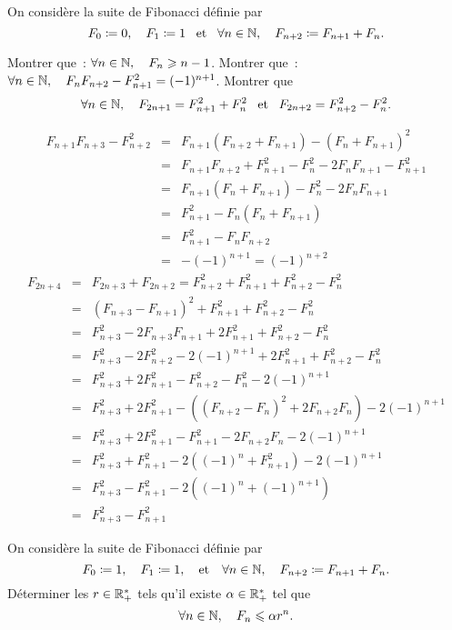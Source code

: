 \documentclass{magnolia}
\begin{document}
On considère la suite de {\sc Fibonacci} définie par
\[F_0\coloneqq 0,\quad F_1\coloneqq 1 \quad\!\text{et}\quad\! \forall n\in\mathbb{N},\quad F_{n+2}\coloneqq F_{n+1}+F_n.\]
\begin{questions} 
\question Montrer que~: $\forall n\in\mathbb{N},\quad F_n\geqslant n-1$. 
\question Montrer que~: $\forall n\in\mathbb{N},\quad F_nF_{n+2}-F_{n+1}^2=(-1)^{n+1}$. 
\question Montrer que
  \[\forall n\in\mathbb{N},\quad F_{2n+1}=F_{n+1}^2+F_n^2 \quad\!\text{et}\quad\! F_{2n+2}=F_{n+2}^2-F_{n}^2.\]
\end{questions}
\begin{sol}
\begin{questions}
\question
\question
\begin{eqnarray*}
F_{n+1}F_{n+3}-F_{n+2}^2
&=& F_{n+1}(F_{n+2}+F_{n+1})-(F_n+F_{n+1})^2\\
&=& F_{n+1}F_{n+2}+F_{n+1}^2-F_n^2-2F_n F_{n+1}-F_{n+1}^2\\
&=& F_{n+1}(F_n+F_{n+1}) -F_n^2-2F_n F_{n+1}\\
&=& F_{n+1}^2-F_n(F_n+F_{n+1})\\
&=& F_{n+1}^2-F_n F_{n+2}\\
&=& -(-1)^{n+1} = (-1)^{n+2}
\end{eqnarray*}
\question
\begin{eqnarray*}
F_{2n+4}
&=& F_{2n+3}+F_{2n+2}=F_{n+2}^2+F_{n+1}^2+F_{n+2}^2-F_{n}^2\\
&=& (F_{n+3}-F_{n+1})^2+F_{n+1}^2+F_{n+2}^2-F_{n}^2\\
&=& F_{n+3}^2-2F_{n+3}F_{n+1}+2F_{n+1}^2+F_{n+2}^2-F_{n}^2\\
&=& F_{n+3}^2-2F_{n+2}^2-2(-1)^{n+1}+2F_{n+1}^2+F_{n+2}^2-F_{n}^2\\
&=& F_{n+3}^2+2F_{n+1}^2-F_{n+2}^2-F_{n}^2-2(-1)^{n+1}\\
&=& F_{n+3}^2+2F_{n+1}^2-((F_{n+2}-F_{n})^2+2F_{n+2}F_n)-2(-1)^{n+1}\\
&=& F_{n+3}^2+2F_{n+1}^2-F_{n+1}^2-2F_{n+2}F_n-2(-1)^{n+1}\\
&=& F_{n+3}^2+F_{n+1}^2-2((-1)^n+F_{n+1}^2)-2(-1)^{n+1}\\
&=& F_{n+3}^2-F_{n+1}^2-2((-1)^n+(-1)^{n+1})\\
&=&F_{n+3}^2-F_{n+1}^2
\end{eqnarray*}
\end{questions}
\end{sol}

On considère la suite de {\sc Fibonacci} définie par
\[F_0\coloneqq 1, \quad F_1\coloneqq 1, \quad\text{et}\quad \forall n\in\mathbb{N},\quad F_{n+2}\coloneqq F_{n+1}+F_n.\]
Déterminer les $r\in\mathbb{R}_+^*$ tels qu'il existe $\alpha\in\mathbb{R}_+^*$ tel que
\[\forall n\in\mathbb{N},\quad F_n\leqslant \alpha r^n.\]
\end{document}
